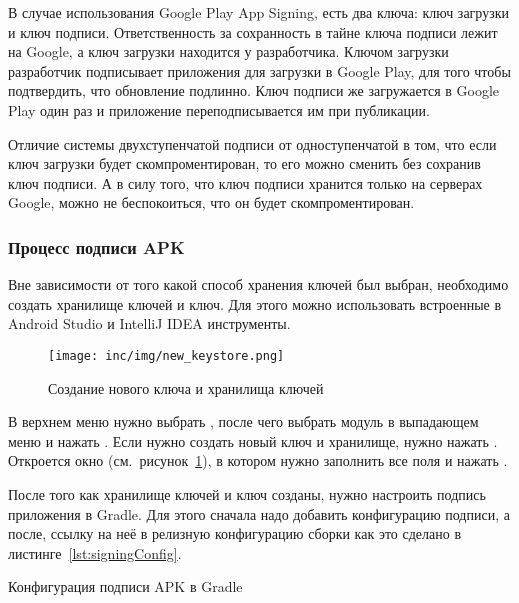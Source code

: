 В случае использования Google Play App Signing, есть два ключа: ключ загрузки и ключ подписи.
Ответственность за сохранность в тайне ключа подписи лежит на Google, а ключ загрузки находится у разработчика.
Ключом загрузки разработчик подписывает приложения для загрузки в Google Play, для того чтобы подтвердить, что обновление подлинно.
Ключ подписи же загружается в Google Play один раз и приложение переподписывается им при публикации.


Отличие системы двухступенчатой подписи от одноступенчатой в том, что если ключ загрузки будет скомпроментирован, то его можно сменить без сохранив ключ подписи.
А в силу того, что ключ подписи хранится только на серверах Google, можно не беспокоиться, что он будет скомпроментирован.

\subsubsection*{Процесс подписи APK}

Вне зависимости от того какой способ хранения ключей был выбран, необходимо создать хранилище ключей и ключ.
Для этого можно использовать встроенные в Android Studio и IntelliJ IDEA инструменты.

\begin{figure}[ht]
  \centering
  \texttt{[image: inc/img/new\_keystore.png]}
  \caption{Создание нового ключа и хранилища ключей}
  \label{fig:newKeystore}
\end{figure}

В верхнем меню нужно выбрать , после чего выбрать модуль в выпадающем меню и нажать .
Если нужно создать новый ключ и хранилище, нужно нажать .
Откроется окно  (см.~рисунок~\ref{fig:newKeystore}), в котором нужно заполнить все поля и нажать .

После того как хранилище ключей и ключ созданы, нужно настроить подпись приложения в Gradle.
Для этого сначала надо добавить конфигурацию подписи, а после, ссылку на неё в релизную конфигурацию сборки как это сделано в листинге~\ref{lst:signingConfig}.

\begin{listing}[h]
  \caption{Конфигурация подписи APK в Gradle}
  \label{lst:signingConfig}
\end{listing}

